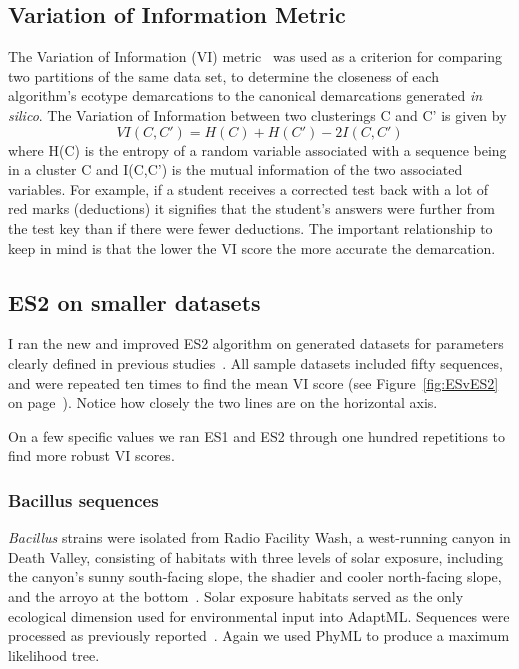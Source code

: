 \subsection*{Variation of Information Metric}
The Variation of Information (VI) metric~\cite{meilua2003comparing} was used as a criterion for comparing two partitions of the same data set, to determine the closeness of each algorithm's ecotype demarcations to the canonical demarcations generated \emph{in silico}.
The Variation of Information between two clusterings C and C' is given by$$VI(C, C') = H(C) + H(C') - 2I(C, C')$$where H(C) is the entropy of a random variable associated with a sequence being in a cluster C and I(C,C') is the mutual information of the two associated variables.
For example, if a student receives a corrected test back with a lot of red marks (deductions) it signifies that the student's answers were further from the test key than if there were fewer deductions.
The important relationship to keep in mind is that the lower the VI score the more accurate the demarcation.

\subsection*{ES2 on smaller datasets}
I ran the new and improved ES2 algorithm on generated datasets for parameters clearly defined in previous studies~\cite{carlo}.
All sample datasets included fifty sequences, and were repeated ten times to find the mean VI score (see Figure~\ref{fig:ESvES2} on page~\pageref{fig:ESvES2}).
Notice how closely the two lines are on the horizontal axis.

On a few specific values we ran ES1 and ES2 through one hundred repetitions to find more robust VI scores.

\subsubsection*{Bacillus sequences}
\emph{Bacillus} strains were isolated from Radio Facility Wash, a west-running canyon in Death Valley, consisting of habitats with three levels of solar exposure, including the canyon's sunny south-facing slope, the shadier and cooler north-facing slope, and the arroyo at the bottom~\cite{connor2010ecology}.
Solar exposure habitats served as the only ecological dimension used for environmental input into AdaptML.
Sequences were processed as previously reported~\cite{carlo}.
Again we used PhyML to produce a maximum likelihood tree.


